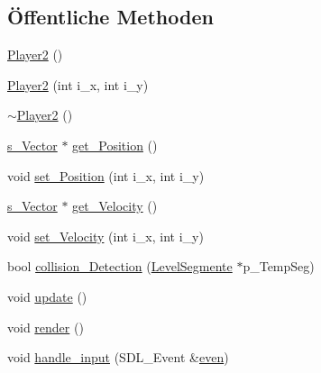 \subsection*{Öffentliche Methoden}
\begin{DoxyCompactItemize}
\item 
\hyperlink{class_player2_acb393ded989958cc2771e4363ff3c107}{Player2} ()
\item 
\hyperlink{class_player2_ac21206d9a2860c10a510a8200e5b1d82}{Player2} (int i\-\_\-x, int i\-\_\-y)
\item 
\hyperlink{class_player2_a80c6d67d67827f3f2ac05214dadddfd3}{$\sim$\-Player2} ()
\item 
\hyperlink{structs___vector}{s\-\_\-\-Vector} $\ast$ \hyperlink{class_player2_a78d7625285d5fab78431e257325f5592}{get\-\_\-\-Position} ()
\item 
void \hyperlink{class_player2_a3a6f363502f4241020de0e641dad4111}{set\-\_\-\-Position} (int i\-\_\-x, int i\-\_\-y)
\item 
\hyperlink{structs___vector}{s\-\_\-\-Vector} $\ast$ \hyperlink{class_player2_a05675802549c3f3458fa38129ee77cfd}{get\-\_\-\-Velocity} ()
\item 
void \hyperlink{class_player2_a0a386cf73970cab8fb22462fbc252fa3}{set\-\_\-\-Velocity} (int i\-\_\-x, int i\-\_\-y)
\item 
bool \hyperlink{class_player2_a8433489a1c934924f93b3164194e6bbb}{collision\-\_\-\-Detection} (\hyperlink{class_level_segmente}{Level\-Segmente} $\ast$p\-\_\-\-Temp\-Seg)
\item 
void \hyperlink{class_player2_a930161d0d6bad9b47852ff1127da3ff5}{update} ()
\item 
void \hyperlink{class_player2_a4a4b0e14f00b815f6b190939d83be5fa}{render} ()
\item 
void \hyperlink{class_player2_abbe0b72e64e8d72b88dd2f2f87b61e94}{handle\-\_\-input} (S\-D\-L\-\_\-\-Event \&\hyperlink{main_8cpp_af6a41c81a6372a814ffae9ba6615e1e7}{even})
\end{DoxyCompactItemize}


